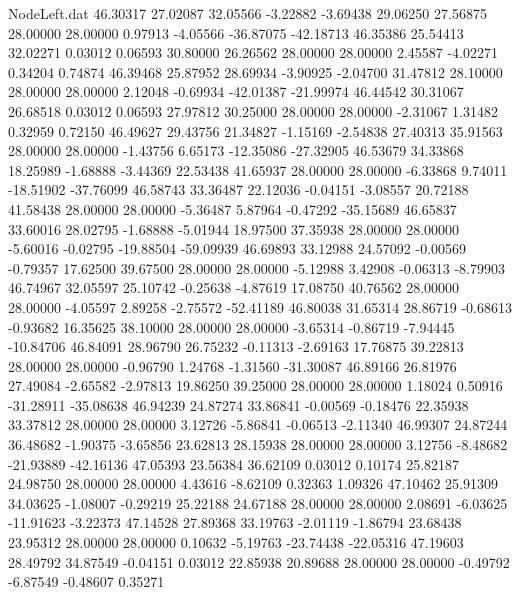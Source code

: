 \begin{filecontents}{NodeLeft.dat}
  46.30317   27.02087   32.05566    -3.22882   -3.69438   29.06250   27.56875   28.00000   28.00000    0.97913   -4.05566  -36.87075  -42.18713
  46.35386   25.54413   32.02271     0.03012    0.06593   30.80000   26.26562   28.00000   28.00000    2.45587   -4.02271    0.34204    0.74874
  46.39468   25.87952   28.69934    -3.90925   -2.04700   31.47812   28.10000   28.00000   28.00000    2.12048   -0.69934  -42.01387  -21.99974
  46.44542   30.31067   26.68518     0.03012    0.06593   27.97812   30.25000   28.00000   28.00000   -2.31067    1.31482    0.32959    0.72150
  46.49627   29.43756   21.34827    -1.15169   -2.54838   27.40313   35.91563   28.00000   28.00000   -1.43756    6.65173  -12.35086  -27.32905
  46.53679   34.33868   18.25989    -1.68888   -3.44369   22.53438   41.65937   28.00000   28.00000   -6.33868    9.74011  -18.51902  -37.76099
  46.58743   33.36487   22.12036    -0.04151   -3.08557   20.72188   41.58438   28.00000   28.00000   -5.36487    5.87964   -0.47292  -35.15689
  46.65837   33.60016   28.02795    -1.68888   -5.01944   18.97500   37.35938   28.00000   28.00000   -5.60016   -0.02795  -19.88504  -59.09939
  46.69893   33.12988   24.57092    -0.00569   -0.79357   17.62500   39.67500   28.00000   28.00000   -5.12988    3.42908   -0.06313   -8.79903
  46.74967   32.05597   25.10742    -0.25638   -4.87619   17.08750   40.76562   28.00000   28.00000   -4.05597    2.89258   -2.75572  -52.41189
  46.80038   31.65314   28.86719    -0.68613   -0.93682   16.35625   38.10000   28.00000   28.00000   -3.65314   -0.86719   -7.94445  -10.84706
  46.84091   28.96790   26.75232    -0.11313   -2.69163   17.76875   39.22813   28.00000   28.00000   -0.96790    1.24768   -1.31560  -31.30087
  46.89166   26.81976   27.49084    -2.65582   -2.97813   19.86250   39.25000   28.00000   28.00000    1.18024    0.50916  -31.28911  -35.08638
  46.94239   24.87274   33.86841    -0.00569   -0.18476   22.35938   33.37812   28.00000   28.00000    3.12726   -5.86841   -0.06513   -2.11340
  46.99307   24.87244   36.48682    -1.90375   -3.65856   23.62813   28.15938   28.00000   28.00000    3.12756   -8.48682  -21.93889  -42.16136
  47.05393   23.56384   36.62109     0.03012    0.10174   25.82187   24.98750   28.00000   28.00000    4.43616   -8.62109    0.32363    1.09326
  47.10462   25.91309   34.03625    -1.08007   -0.29219   25.22188   24.67188   28.00000   28.00000    2.08691   -6.03625  -11.91623   -3.22373
  47.14528   27.89368   33.19763    -2.01119   -1.86794   23.68438   23.95312   28.00000   28.00000    0.10632   -5.19763  -23.74438  -22.05316
  47.19603   28.49792   34.87549    -0.04151    0.03012   22.85938   20.89688   28.00000   28.00000   -0.49792   -6.87549   -0.48607    0.35271

\end{filecontents}
